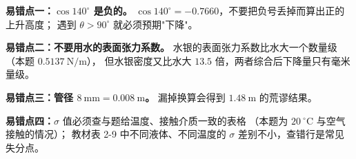 \begin{yicuo}
\textbf{易错点一：$\cos 140^{\circ}$ 是负的。}
$\cos 140^{\circ}=-0.7660$，不要把负号丢掉而算出正的上升高度；
遇到 $\theta>90^{\circ}$ 就必须预期"下降"。

\textbf{易错点二：不要用水的表面张力系数。}
水银的表面张力系数比水大一个数量级（本题 $0.5137\ \mathrm{N/m}$），
但水银密度又比水大 $13.5$ 倍，两者综合后下降量只有毫米量级。

\textbf{易错点三：管径 $8\ \mathrm{mm}=0.008\ \mathrm{m}$。}
漏掉换算会得到 $1.48\ \mathrm{m}$ 的荒谬结果。

\textbf{易错点四：}$\sigma$ 值必须查与题给温度、接触介质一致的表格
（本题为 $20\ ^{\circ}\mathrm{C}$ 与空气接触的情况）；
教材表 2-9 中不同液体、不同温度的 $\sigma$ 差别不小，查错行是常见失分点。
\end{yicuo}
